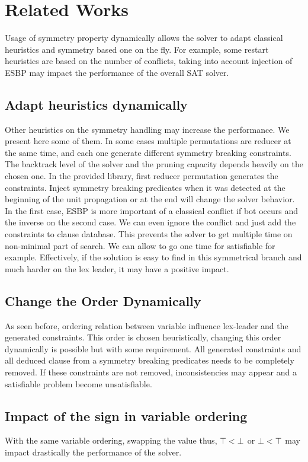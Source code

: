 \section{Related Works}
Usage of symmetry property dynamically allows the solver to adapt classical heuristics and symmetry based one on the fly.
For example, some restart heuristics are based on the number of conflicts, taking into account injection of ESBP may impact
the performance of the overall SAT solver. 
\subsection{Adapt heuristics dynamically}
Other heuristics on the symmetry handling may increase the performance. We present here some of them.
In some cases multiple permutations are reducer at the same time, and each one generate different symmetry breaking constraints.
The backtrack level of the solver and the pruning capacity depends heavily on the chosen one. In the provided library, first reducer permutation generates the constraints. Inject symmetry breaking predicates when it was detected at the beginning of the 
unit propagation or at the end will change the solver behavior. In the first case, ESBP is more important of a classical conflict
if bot occurs and the inverse on the second case. We can even ignore the conflict and just add the constraints to clause database.
This prevents the solver to get multiple time on non-minimal part of search. We can allow to go one time for satisfiable  
for example. Effectively, if the solution is easy to find in this symmetrical branch and much harder on the lex leader, it may
have a positive impact.
\subsection{Change the Order Dynamically}
As seen before, ordering relation between variable influence lex-leader and the generated constraints. This order is chosen 
heuristically, changing this order dynamically is possible but with some requirement. All generated constraints and all deduced 
clause from a symmetry breaking predicates needs to be completely removed. If these constraints are not removed, inconsistencies 
may appear and a satisfiable problem become unsatisfiable.


\subsection{Impact of the sign in variable ordering}
With the same variable ordering, swapping the value thus, $\top < \bot$ or $\bot < \top$
may impact drastically the performance of the solver.

